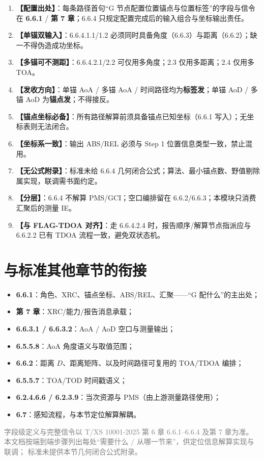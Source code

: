 \documentclass[11pt,a4paper]{ctexart}
\begin{document}
\begin{enumerate}[nosep]
  \item \textbf{【配置出处】}：每条路径首句``G 节点配置位置锚点与位置标签''的字段与信令在
        \textbf{6.6.1} / \textbf{第 7 章}；6.6.4 只规定配置完成后的输入组合与坐标输出责任。
  \item \textbf{【单锚双输入】}：6.6.4.1.1/1.2 必须同时具备角度（6.6.3）与距离（6.6.2）；缺一不得伪造成功坐标。
  \item \textbf{【多锚可不测距】}：6.6.4.2.1/2.2 可仅用多角度；2.3 仅用多距离；2.4 仅用多 TOA。
  \item \textbf{【发收方向】}：单锚 AoA / 多锚 AoA / 时间路径均为\textbf{标签发}；单锚 AoD / 多锚 AoD 为\textbf{锚点发}；不得接反。
  \item \textbf{【锚点坐标必备】}：所有路径解算前须具备锚点已知坐标（6.6.1 写入）；无坐标表则无法闭合。
  \item \textbf{【坐标系一致】}：输出 ABS/REL 必须与 Step 1 位置信息类型一致，禁止混用。
  \item \textbf{【无公式附录】}：标准未给 6.6.4 几何闭合公式；算法、最小锚点数、野值剔除属实现，联调需书面约定。
  \item \textbf{【分层】}：6.6.4 不解算 PMS/GCI；空口编排留在 6.6.2/6.6.3；本模块只消费汇聚后的测量 IE。
  \item \textbf{【与 FLAG-TDOA 对齐】}：走 6.6.4.2.4 时，报告顺序/解算节点指派应与 6.6.2.2 已有 TDOA 流程一致，避免双状态机。
\end{enumerate}

\section{与标准其他章节的衔接}

\begin{itemize}[nosep]
  \item \textbf{6.6.1}：角色、XRC、锚点坐标、ABS/REL、汇聚——``G 配什么''的主出处；
  \item \textbf{第 7 章}：XRC/能力/报告消息承载；
  \item \textbf{6.6.3.1 / 6.6.3.2}：AoA / AoD 空口与测量输出；
  \item \textbf{6.5.5.8}：AoA 角度语义与取值范围；
  \item \textbf{6.6.2}：距离 $D$、距离矩阵、以及时间路径可复用的 TOA/TDOA 编排；
  \item \textbf{6.5.5.7}：TOA/TOD 时间戳语义；
  \item \textbf{6.2.4.6.6 / 6.2.3.9}：当次资源与 PMS（由上游测量路径使用）；
  \item \textbf{6.7}：感知流程，与本节定位解算解耦。
\end{itemize}

\vfill
\begin{center}
\small\textcolor{gray}{字段级定义与完整信令以 T/XS 10001-2025 第 6 章 6.6.1--6.6.4 及第 7 章为准。
本文档按端到端步骤列出每处``需要什么 / 从哪一节来''，供定位信息解算实现与联调；
标准未提供本节几何闭合公式附录。}
\end{center}
\end{document}

